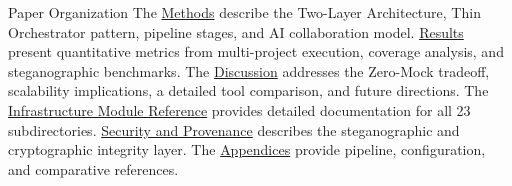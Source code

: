 \documentclass[
  ignorenonframetext,
]{beamer}
\begin{document}
\begin{frame}[allowframebreaks]{Paper Organization}
\protect{}\label{paper-organization}
The \href{03a_architecture.md\#methods}{Methods} describe the Two-Layer
Architecture, Thin Orchestrator pattern, pipeline stages, and AI
collaboration model. \href{04_results.md\#results}{Results} present
quantitative metrics from multi-project execution, coverage analysis,
and steganographic benchmarks. The
\href{05a_zeromock_tradeoff.md\#the-zero-mock-tradeoff}{Discussion}
addresses the Zero-Mock tradeoff, scalability implications, a detailed
tool comparison, and future directions. The
\href{06_infrastructure_modules.md\#infrastructure-module-reference}{Infrastructure
Module Reference} provides detailed documentation for all 23
subdirectories.
\href{07_security_provenance.md\#security-and-provenance}{Security and
Provenance} describes the steganographic and cryptographic integrity
layer. The
\href{08a_appendix_pipeline.md\#appendix-pipeline}{Appendices} provide
pipeline, configuration, and comparative references.
\end{frame}
\end{document}
